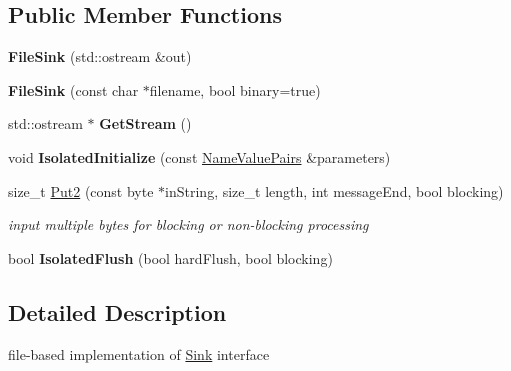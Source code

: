 \subsection*{Public Member Functions}
\begin{DoxyCompactItemize}
\item 
\hypertarget{class_file_sink_ae7e571c08f2334948fc56249688cac24}{
{\bfseries FileSink} (std::ostream \&out)}
\label{class_file_sink_ae7e571c08f2334948fc56249688cac24}

\item 
\hypertarget{class_file_sink_acf2703863fea64dbd82c2108245f8533}{
{\bfseries FileSink} (const char $\ast$filename, bool binary=true)}
\label{class_file_sink_acf2703863fea64dbd82c2108245f8533}

\item 
\hypertarget{class_file_sink_ae5c7c47d99b38ed04fb96c2e35e797e2}{
std::ostream $\ast$ {\bfseries GetStream} ()}
\label{class_file_sink_ae5c7c47d99b38ed04fb96c2e35e797e2}

\item 
\hypertarget{class_file_sink_add89bb9890b60ce429ba590941099790}{
void {\bfseries IsolatedInitialize} (const \hyperlink{class_name_value_pairs}{NameValuePairs} \&parameters)}
\label{class_file_sink_add89bb9890b60ce429ba590941099790}

\item 
size\_\-t \hyperlink{class_file_sink_a7d9f9457b3a9d7db252e8ba75487020a}{Put2} (const byte $\ast$inString, size\_\-t length, int messageEnd, bool blocking)
\begin{DoxyCompactList}\small\item\em input multiple bytes for blocking or non-\/blocking processing \item\end{DoxyCompactList}\item 
\hypertarget{class_file_sink_af6485914da76e0374ad93d79da10030f}{
bool {\bfseries IsolatedFlush} (bool hardFlush, bool blocking)}
\label{class_file_sink_af6485914da76e0374ad93d79da10030f}

\end{DoxyCompactItemize}


\subsection{Detailed Description}
file-\/based implementation of \hyperlink{class_sink}{Sink} interface 

